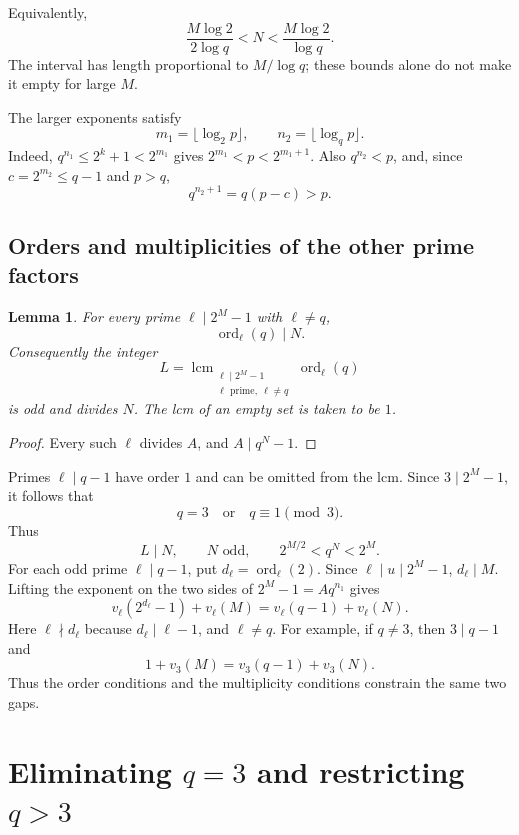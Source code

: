 \documentclass[11pt]{article}
\newtheorem{lemma}{Lemma}
\begin{document}
Equivalently,
\begin{equation}\label{eq:window}
\frac{M\log2}{2\log q}<N<\frac{M\log2}{\log q}.
\end{equation}
The interval has length proportional to $M/\log q$; these bounds alone
do not make it empty for large $M$.

The larger exponents satisfy
\[
m_1=\lfloor\log_2p\rfloor,\qquad
n_2=\lfloor\log_qp\rfloor.
\]
Indeed, $q^{n_1}\leq2^k+1<2^{m_1}$ gives
$2^{m_1}<p<2^{m_1+1}$. Also $q^{n_2}<p$, and, since
$c=2^{m_2}\leq q-1$ and $p>q$,
\[
q^{n_2+1}=q(p-c)>p.
\]

\subsection{Orders and multiplicities of the other prime factors}

\begin{lemma}\label{lem:orders}
For every prime $\ell\mid2^M-1$ with $\ell\neq q$,
\[
\operatorname{ord}_\ell(q)\mid N.
\]
Consequently the integer
\[
L=\operatorname{lcm}_{\substack{\ell\mid2^M-1\\
\ell\text{ prime},\ \ell\neq q}}
\operatorname{ord}_\ell(q)
\]
is odd and divides $N$. The lcm of an empty set is taken to be $1$.
\end{lemma}
\begin{proof}
Every such $\ell$ divides $A$, and $A\mid q^N-1$.
\end{proof}

Primes $\ell\mid q-1$ have order $1$ and can be omitted from the lcm.
Since $3\mid2^M-1$, it follows that
\[
q=3\quad\text{or}\quad q\equiv1\pmod3.
\]
Thus
\[
L\mid N,\qquad N\text{ odd},\qquad
2^{M/2}<q^N<2^M.
\]
For each odd prime $\ell\mid q-1$, put
$d_\ell=\operatorname{ord}_\ell(2)$. Since $\ell\mid u\mid2^M-1$,
$d_\ell\mid M$. Lifting the exponent on the two sides of
$2^M-1=Aq^{n_1}$ gives
\begin{equation}\label{eq:valuation-coupling}
\boxed{
v_\ell(2^{d_\ell}-1)+v_\ell(M)
 =v_\ell(q-1)+v_\ell(N).}
\end{equation}
Here $\ell\nmid d_\ell$ because $d_\ell\mid\ell-1$, and $\ell\neq q$.
For example, if $q\neq3$, then $3\mid q-1$ and
\[
1+v_3(M)=v_3(q-1)+v_3(N).
\]
Thus the order conditions and the multiplicity conditions constrain
the same two gaps.

\section{\texorpdfstring{Eliminating $q=3$ and restricting $q>3$}{Eliminating q=3 and restricting q>3}}
\label{sec:parities}
\end{document}
